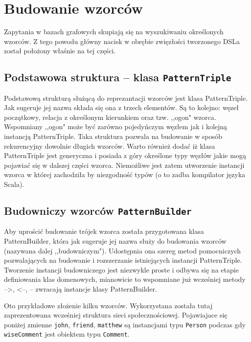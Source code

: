 \documentclass[brudnopis]{xmgr}
\begin{document}
\section{Budowanie wzorców}

Zapytania w bazach grafowych skupiają się na wyszukiwaniu określonych wzorców. Z tego powodu główny nacisk w obrębie zwięzłości tworzonego DSLa został położony właśnie na tej części.

\subsection{Podstawowa struktura -- klasa \texttt{PatternTriple}}
Podstawową strukturą służącą do reprezantacji wzorców jest klasa PatternTriple. Jak sugeruje jej nazwa składa się ona z trzech elementów. Są to kolejno: węzeł początkowy, relacja z określonym kierunkiem oraz tzw. ,,ogon" wzorca. Wspomniany ,,ogon" może być zarówno pojedyńczym węzłem jak i kolejną instancją PatternTriple. Taka struktura pozwala na budowanie w sposób rekurencyjny dowolnie długich wzorców. Warto również dodać iż klasa PatternTriple jest generyczna i posiada z góry określone typy węzłów jakie mogą pojawiać się w dalszej części wzorca.  Niemożliwe jest zatem utworzenie instancji wzorca w której zachodziła by niezgodność typów (o to zadba kompilator języka Scala).

\subsection{Budowniczy wzorców \texttt{PatternBuilder}}
Aby uprościć budowanie trójek wzorca została przygotowana klasa PatternBuilder, która jak sugeruje jej nazwa służy do budowania wzorców (nazywana dalej ,,budowniczym"). Udostępnia ona szereg metod pomocniczych pozwalających na budowanie i rozszerzanie istniejących instancji PatternTriple. Tworzenie instancji budowniczego jest niezwykle proste i odbywa się na etapie definiowania klas domenowych, mianowicie to wspomniane już wcześniej metody -->, <--, -- zwracają instancje klasy PatternBuilder.

Oto przykładowe złożenie kilku wzorców. Wykorzystana została tutaj zaprezentowana wcześniej struktura sieci społecznościowej. Pojawiajace się poniżej zmienne \texttt{john}, \texttt{friend}, \texttt{matthew} są instancjami typu \texttt{Person} podczas gdy \texttt{wiseComment} jest obiektem typu \texttt{Comment}.


\end{document}
